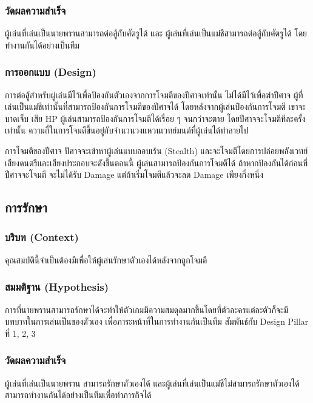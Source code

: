 \subsubsection{วัดผลความสำเร็จ}
ผู้เล่นที่เล่นเป็นนายพรานสามารถต่อสู้กับศัตรูได้ และ ผู้เล่นที่เล่นเป็นแม่ชีสามารถต่อสู้กับศัตรูได้ โดยทำงานกันได้อย่างเป็นทีม

\subsubsection{การออกแบบ (Design)}

การต่อสู้สำหรับผู่เล่นมีไว้เพื่อป้องกันตัวเองจากการโจมตีของปีศาจเท่านั้น ไม่ได้มีไว้เพื่อฆ่าปีศาจ ผู้ที่เล่นเป็นแม่ชีเท่านั้นที่สามารถป้องกันการโจมตีของปีศาจได้ โดยหลังจากผู้เล่นป้องกันการโจมตี เขาจะบาดเจ็บ เสีย HP ผู้เล่นสามารถป้องกันการโจมตีได้เรื่อย ๆ จนกว่าจะตาย โดยปีศาจจะโจมตีทีละครั้งเท่านั้น ความถี่ในการโจมตีขึ้นอยู่กับจำนวนวงแหวนเวทย์มนต์ที่ผู้เล่นได้ทำลายไป

การโจมตีของปีศาจ ปีศาจจะเข้าหาผู้เล่นแบบลอบเร้น (Stealth) และจะโจมตีโดยการปล่อยพลังเวทย์ เสียงดนตรีและเสียงประกอบจะดังขึ้นตอนนี้ ผู้เล่นสามารถป้องกันการโจมตีได้ ถ้าหากป้องกันได้ก่อนที่ปีศาจจะโจมตี จะไม่ได้รับ Damage แต่ถ้าเริ่มโจมตีแล้วจะลด Damage เพียงกึ่งหนึ่ง

\subsection{การรักษา}

\subsubsection{บริบท (Context)}

คุณสมบัตินี้จำเป็นต้องมีเพื่อให้ผู้เล่นรักษาตัวเองได้หลังจากถูกโจมตี

\subsubsection{สมมติฐาน (Hypothesis)}

การที่นายพรานสามารถรักษาได้จะทำให้ตัวเกมมีความสมดุลมากขึ้นโดยที่ตัวละครแต่ละตัวก็จะมีบทบาทในการเล่นเป็นของตัวเอง เพื่อภาระหน้าที่ในการทำงานกันเป็นทีม สัมพันธ์กับ Design Pillar ที่ 1, 2, 3

\subsubsection{วัดผลความสำเร็จ}

ผู้เล่นที่เล่นเป็นนายพราน สามารถรักษาตัวเองได้ และผู้เล่นที่เล่นเป็นแม่ชีไม่สามารถรักษาตัวเองได้ สามารถทำงานกันได้อย่างเป็นทีมเพื่อทำภารกิจได้

